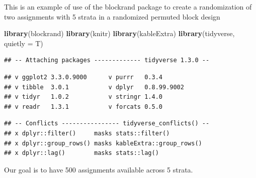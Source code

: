 \documentclass[
]{book}
\newenvironment{Shaded}{\begin{snugshade}}{\end{snugshade}}
\newcommand{\DataTypeTok}[1]{\textcolor[rgb]{0.13,0.29,0.53}{#1}}
\newcommand{\DecValTok}[1]{\textcolor[rgb]{0.00,0.00,0.81}{#1}}
\newcommand{\KeywordTok}[1]{\textcolor[rgb]{0.13,0.29,0.53}{\textbf{#1}}}
\newcommand{\NormalTok}[1]{#1}
\newcommand{\OperatorTok}[1]{\textcolor[rgb]{0.81,0.36,0.00}{\textbf{#1}}}
\newcommand{\StringTok}[1]{\textcolor[rgb]{0.31,0.60,0.02}{#1}}
\begin{document}
This is an example of use of the blockrand package to create a randomization of two assignments with 5 strata in a randomized permuted block design

\begin{Shaded}
\begin{Highlighting}[]
\KeywordTok{library}\NormalTok{(blockrand)}
\KeywordTok{library}\NormalTok{(knitr)}
\KeywordTok{library}\NormalTok{(kableExtra)}
\KeywordTok{library}\NormalTok{(tidyverse, }\DataTypeTok{quietly =}\NormalTok{ T)}
\end{Highlighting}
\end{Shaded}

\begin{verbatim}
## -- Attaching packages ------------- tidyverse 1.3.0 --
\end{verbatim}

\begin{verbatim}
## v ggplot2 3.3.0.9000      v purrr   0.3.4      
## v tibble  3.0.1           v dplyr   0.8.99.9002
## v tidyr   1.0.2           v stringr 1.4.0      
## v readr   1.3.1           v forcats 0.5.0
\end{verbatim}

\begin{verbatim}
## -- Conflicts ---------------- tidyverse_conflicts() --
## x dplyr::filter()     masks stats::filter()
## x dplyr::group_rows() masks kableExtra::group_rows()
## x dplyr::lag()        masks stats::lag()
\end{verbatim}

Our goal is to have 500 assignments available across 5 strata.

\begin{Shaded}
\end{Shaded}
\end{document}
